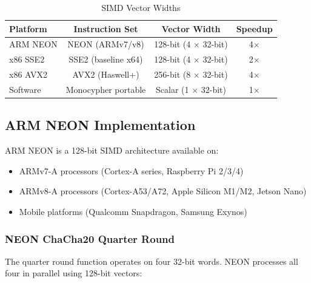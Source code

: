 \documentclass[11pt,a4paper]{article}
\begin{document}
\begin{table}[H]
\centering
\begin{tabular}{@{}lccc@{}}
\toprule
\textbf{Platform} & \textbf{Instruction Set} & \textbf{Vector Width} & \textbf{Speedup} \\
\midrule
ARM NEON    & NEON (ARMv7/v8)     & 128-bit (4 $\times$ 32-bit) & 4$\times$ \\
x86 SSE2    & SSE2 (baseline x64) & 128-bit (4 $\times$ 32-bit) & 2$\times$ \\
x86 AVX2    & AVX2 (Haswell+)     & 256-bit (8 $\times$ 32-bit) & 4$\times$ \\
Software    & Monocypher portable & Scalar (1 $\times$ 32-bit)  & 1$\times$ \\
\bottomrule
\end{tabular}
\caption{SIMD Vector Widths}
\end{table}

\subsection{ARM NEON Implementation}

ARM NEON is a 128-bit SIMD architecture available on:
\begin{itemize}[noitemsep]
    \item ARMv7-A processors (Cortex-A series, Raspberry Pi 2/3/4)
    \item ARMv8-A processors (Cortex-A53/A72, Apple Silicon M1/M2, Jetson Nano)
    \item Mobile platforms (Qualcomm Snapdragon, Samsung Exynos)
\end{itemize}

\subsubsection{NEON ChaCha20 Quarter Round}

The quarter round function operates on four 32-bit words. NEON processes all four in parallel using 128-bit vectors:
\end{document}
